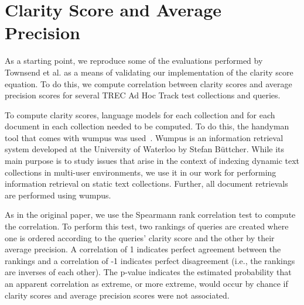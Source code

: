 \documentclass[format=sigconf, screen=true, review=false]{acmart}
\begin{document}







\section{Clarity Score and Average Precision}
\label{section:clarity-score}
As a starting point, we reproduce some of the evaluations performed by Townsend et al. as a means of validating our implementation of the clarity score equation.
To do this, we compute correlation between clarity scores and average precision scores for several TREC Ad Hoc Track test collections and queries.

To compute clarity scores, language models for each collection and for each document in each collection needed to be computed.
To do this, the handyman tool that comes with wumpus was used~\cite{buettcher2009wumpus}.
Wumpus is an information retrieval system developed at the University of Waterloo by Stefan Büttcher.
While its main purpose is to study issues that arise in the context of indexing dynamic text collections in multi-user environments, we use it in our work for performing information retrieval on static text collections.
Further, all document retrievals are performed using wumpus.

As in the original paper, we use the Spearmann rank correlation test to compute the correlation.
To perform this test, two rankings of queries are created where one is ordered according to the queries' clarity score and the other by their average precision. %
A correlation of 1 indicates perfect agreement between the rankings and a correlation of -1 indicates perfect disagreement (i.e., the rankings are inverses of each other).
The p-value indicates the estimated probability that an apparent correlation as extreme, or more extreme, would occur by chance if clarity scores and average precision scores were not associated.
\end{document}
